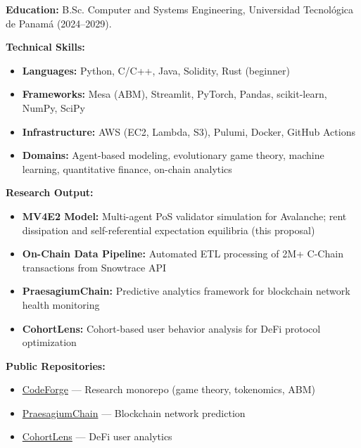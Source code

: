 \documentclass[11pt,a4paper]{article}
\begin{document}
\textbf{Education:} B.Sc. Computer and Systems Engineering, Universidad Tecnol\'{o}gica de Panam\'{a} (2024--2029).

\textbf{Technical Skills:}
\begin{itemize}
    \item \textbf{Languages:} Python, C/C++, Java, Solidity, Rust (beginner)
    \item \textbf{Frameworks:} Mesa (ABM), Streamlit, PyTorch, Pandas, scikit-learn, NumPy, SciPy
    \item \textbf{Infrastructure:} AWS (EC2, Lambda, S3), Pulumi, Docker, GitHub Actions
    \item \textbf{Domains:} Agent-based modeling, evolutionary game theory, machine learning, quantitative finance, on-chain analytics
\end{itemize}

\textbf{Research Output:}
\begin{itemize}
    \item \textbf{MV4E2 Model:} Multi-agent PoS validator simulation for Avalanche; rent dissipation and self-referential expectation equilibria (this proposal)
    \item \textbf{On-Chain Data Pipeline:} Automated ETL processing of 2M+ C-Chain transactions from Snowtrace API
    \item \textbf{PraesagiumChain:} Predictive analytics framework for blockchain network health monitoring
    \item \textbf{CohortLens:} Cohort-based user behavior analysis for DeFi protocol optimization
\end{itemize}

\textbf{Public Repositories:}
\begin{itemize}
    \item \href{https://github.com/Quantumquirkz/CodeForge}{CodeForge} --- Research monorepo (game theory, tokenomics, ABM)
    \item \href{https://github.com/Quantumquirkz/PraesagiumChain}{PraesagiumChain} --- Blockchain network prediction
    \item \href{https://github.com/Quantumquirkz/CohortLens}{CohortLens} --- DeFi user analytics
\end{itemize}
\end{document}

